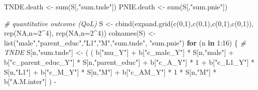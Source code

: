 \documentclass[
]{book}
\newenvironment{Shaded}{\begin{snugshade}}{\end{snugshade}}
\newcommand{\AttributeTok}[1]{\textcolor[rgb]{0.77,0.63,0.00}{#1}}
\newcommand{\CommentTok}[1]{\textcolor[rgb]{0.56,0.35,0.01}{\textit{#1}}}
\newcommand{\ConstantTok}[1]{\textcolor[rgb]{0.00,0.00,0.00}{#1}}
\newcommand{\ControlFlowTok}[1]{\textcolor[rgb]{0.13,0.29,0.53}{\textbf{#1}}}
\newcommand{\DecValTok}[1]{\textcolor[rgb]{0.00,0.00,0.81}{#1}}
\newcommand{\FunctionTok}[1]{\textcolor[rgb]{0.00,0.00,0.00}{#1}}
\newcommand{\NormalTok}[1]{#1}
\newcommand{\OtherTok}[1]{\textcolor[rgb]{0.56,0.35,0.01}{#1}}
\newcommand{\SpecialCharTok}[1]{\textcolor[rgb]{0.00,0.00,0.00}{#1}}
\newcommand{\StringTok}[1]{\textcolor[rgb]{0.31,0.60,0.02}{#1}}
\begin{document}
\begin{Shaded}
\begin{Highlighting}[]
\NormalTok{  TNDE.death }\OtherTok{\textless{}{-}} \FunctionTok{sum}\NormalTok{(S[,}\StringTok{"sum.tnde"}\NormalTok{])}
\NormalTok{  PNIE.death }\OtherTok{\textless{}{-}} \FunctionTok{sum}\NormalTok{(S[,}\StringTok{"sum.pnie"}\NormalTok{])}
  
  \CommentTok{\# quantitative outcome (QoL)}
\NormalTok{  S }\OtherTok{\textless{}{-}} \FunctionTok{cbind}\NormalTok{(}\FunctionTok{expand.grid}\NormalTok{(}\FunctionTok{c}\NormalTok{(}\DecValTok{0}\NormalTok{,}\DecValTok{1}\NormalTok{),}\FunctionTok{c}\NormalTok{(}\DecValTok{0}\NormalTok{,}\DecValTok{1}\NormalTok{),}\FunctionTok{c}\NormalTok{(}\DecValTok{0}\NormalTok{,}\DecValTok{1}\NormalTok{),}\FunctionTok{c}\NormalTok{(}\DecValTok{0}\NormalTok{,}\DecValTok{1}\NormalTok{)), }\FunctionTok{rep}\NormalTok{(}\ConstantTok{NA}\NormalTok{,}\AttributeTok{n=}\DecValTok{2}\SpecialCharTok{\^{}}\DecValTok{4}\NormalTok{), }\FunctionTok{rep}\NormalTok{(}\ConstantTok{NA}\NormalTok{,}\AttributeTok{n=}\DecValTok{2}\SpecialCharTok{\^{}}\DecValTok{4}\NormalTok{))}
  \FunctionTok{colnames}\NormalTok{(S) }\OtherTok{\textless{}{-}} \FunctionTok{list}\NormalTok{(}\StringTok{"male"}\NormalTok{,}\StringTok{"parent\_educ"}\NormalTok{,}\StringTok{"L1"}\NormalTok{,}\StringTok{"M"}\NormalTok{,}\StringTok{"sum.tnde"}\NormalTok{, }\StringTok{"sum.pnie"}\NormalTok{)}
  \ControlFlowTok{for}\NormalTok{ (n }\ControlFlowTok{in} \DecValTok{1}\SpecialCharTok{:}\DecValTok{16}\NormalTok{) \{}
    \CommentTok{\# TNDE }
\NormalTok{    S[n,}\StringTok{"sum.tnde"}\NormalTok{] }\OtherTok{\textless{}{-}}\NormalTok{ ( ( b[}\StringTok{"mu\_Y"}\NormalTok{] }\SpecialCharTok{+} 
\NormalTok{                             b[}\StringTok{"c\_male\_Y"}\NormalTok{] }\SpecialCharTok{*}\NormalTok{ S[n,}\StringTok{"male"}\NormalTok{] }\SpecialCharTok{+} 
\NormalTok{                             b[}\StringTok{"c\_parent\_educ\_Y"}\NormalTok{] }\SpecialCharTok{*}\NormalTok{ S[n,}\StringTok{"parent\_educ"}\NormalTok{] }\SpecialCharTok{+} 
\NormalTok{                             b[}\StringTok{"c\_A\_Y"}\NormalTok{] }\SpecialCharTok{*} \DecValTok{1} \SpecialCharTok{+} 
\NormalTok{                             b[}\StringTok{"c\_L1\_Y"}\NormalTok{] }\SpecialCharTok{*}\NormalTok{ S[n,}\StringTok{"L1"}\NormalTok{] }\SpecialCharTok{+}
\NormalTok{                             b[}\StringTok{"c\_M\_Y"}\NormalTok{] }\SpecialCharTok{*}\NormalTok{ S[n,}\StringTok{"M"}\NormalTok{] }\SpecialCharTok{+}
\NormalTok{                             b[}\StringTok{"c\_AM\_Y"}\NormalTok{] }\SpecialCharTok{*} \DecValTok{1} \SpecialCharTok{*}\NormalTok{ S[n,}\StringTok{"M"}\NormalTok{] }\SpecialCharTok{*}\NormalTok{ b[}\StringTok{"A.M.inter"}\NormalTok{] ) }\SpecialCharTok{{-}} 

\end{Highlighting}
\end{Shaded}
\end{document}
